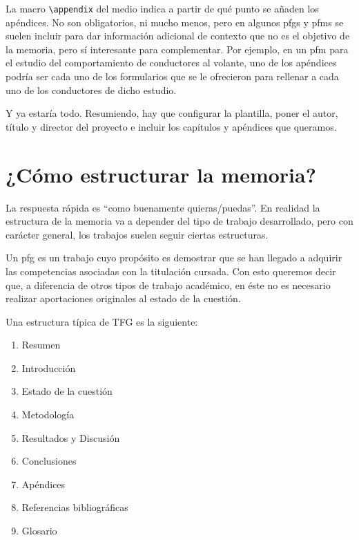 

La macro \lstinline{\appendix} del medio indica a partir de qué punto se añaden los apéndices. No son obligatorios, ni mucho menos, pero en algunos \glspl{pfg} y \glspl{pfm} se suelen incluir para dar información adicional de contexto que no es el objetivo de la memoria, pero sí interesante para complementar. Por ejemplo, en un \gls{pfm} para el estudio del comportamiento de conductores al volante, uno de los apéndices podría ser cada uno de los formularios que se le ofrecieron para rellenar a cada uno de los conductores de dicho estudio.

Y ya estaría todo. Resumiendo, hay que configurar la plantilla, poner el autor, título y director del proyecto e incluir los capítulos y apéndices que queramos.

\section{¿Cómo estructurar la memoria?}
\label{s:como-estructurar}

La respuesta rápida es \enquote{como buenamente quieras/puedas}. En realidad la estructura de la memoria va a depender del tipo de trabajo desarrollado, pero con carácter general, los trabajos suelen seguir ciertas estructuras.

Un \gls{pfg} es un trabajo cuyo propósito es demostrar que se han llegado a adquirir las competencias asociadas con la titulación cursada. Con esto queremos decir que, a diferencia de otros tipos de trabajo académico, en éste no es necesario realizar aportaciones originales al estado de la cuestión.

Una estructura típica de TFG es la siguiente:

\begin{enumerate}
    \item Resumen
    \item Introducción
    \item Estado de la cuestión
    \item Metodología
    \item Resultados y Discusión
    \item Conclusiones
    \item Apéndices
    \item Referencias bibliográficas
    \item Glosario
\end{enumerate}

